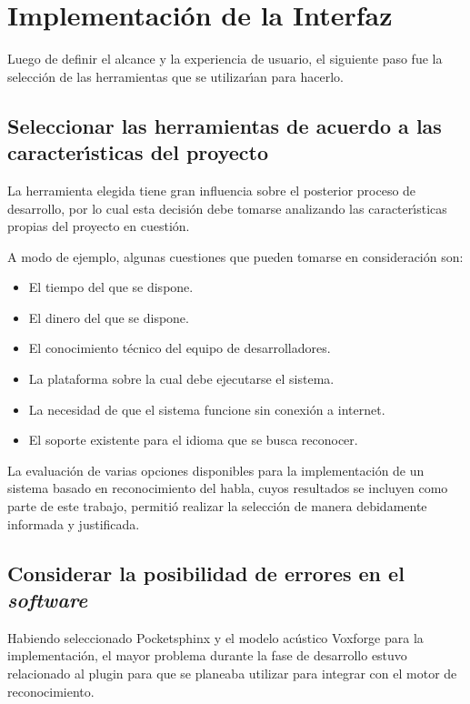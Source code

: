 \section{Implementaci\'on de la Interfaz}
\label{sec:implementacion-interfaz}

Luego de definir el alcance y la experiencia de usuario, el siguiente paso
fue la selecci\'on de las herramientas que se utilizar{\'\i}an para hacerlo. 

\subsection{Seleccionar las herramientas de acuerdo a las \mbox{caracter{\'\i}sticas} del proyecto}
La herramienta elegida tiene gran influencia sobre el posterior proceso de
desarrollo, por lo cual esta decisi\'on debe tomarse analizando las caracter{\'\i}sticas
propias del proyecto en cuesti\'on.

A modo de ejemplo, algunas cuestiones que pueden tomarse en consideraci\'on son:

\begin{itemize}
	\item El tiempo del que se dispone.
	\item El dinero del que se dispone.
	\item El conocimiento t\'ecnico del equipo de desarrolladores.
	\item La plataforma sobre la cual debe ejecutarse el sistema.
	\item La necesidad de que el sistema funcione sin conexi\'on a internet.
	\item El soporte existente para el idioma que se busca reconocer.
\end{itemize}

La evaluaci\'on de varias opciones disponibles para la implementaci\'on de un sistema
basado en reconocimiento del habla, cuyos resultados se incluyen como parte de este
trabajo, permiti\'o realizar la selecci\'on de manera debidamente informada y justificada.

\subsection{Considerar la posibilidad de errores en el \emph{software}}
Habiendo seleccionado Pocketsphinx y el modelo ac\'ustico Voxforge para
la implementaci\'on, el mayor problema durante la fase de desarrollo estuvo relacionado
al plugin para  \cite{GstreamerPocketsphinx} que se planeaba utilizar para integrar 
con el motor de reconocimiento.

